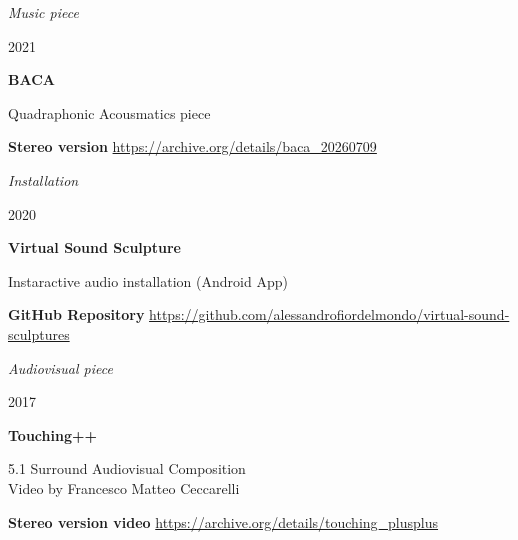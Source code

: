 \documentclass[7pt,a4paper]{article}
\begin{document}
\begin{mdframed}[
    backgroundcolor=white,
    linecolor=white,
    linewidth=0pt,
    innerleftmargin=6pt,
    innerrightmargin=6pt,
    innertopmargin=6pt,
    innerbottommargin=6pt,
    skipabove=0pt,
    skipbelow=0pt
]

\scriptsize \textit{Music piece}
\par \small 2021
\par \normalsize \textbf{BACA}
\par \small Quadraphonic Acousmatics piece


\par \scriptsize \textbf{Stereo version} \href{https://archive.org/details/baca\_20260709}{https://archive.org/details/baca\_20260709}


\vspace{0.5cm}
\end{mdframed}


\begin{mdframed}[
    backgroundcolor=entrygray,
    linecolor=entrygray,
    linewidth=0pt,
    innerleftmargin=6pt,
    innerrightmargin=6pt,
    innertopmargin=6pt,
    innerbottommargin=6pt,
    skipabove=0pt,
    skipbelow=0pt
]

\scriptsize \textit{Installation}
\par \small 2020
\par \normalsize \textbf{Virtual Sound Sculpture}
\par \small Instaractive audio installation (Android App)


\par \scriptsize \textbf{GitHub Repository} \href{https://github.com/alessandrofiordelmondo/virtual-sound-sculptures}{https://github.com/alessandrofiordelmondo/virtual-sound-sculptures}


\vspace{0.5cm}
\end{mdframed}


\begin{mdframed}[
    backgroundcolor=white,
    linecolor=white,
    linewidth=0pt,
    innerleftmargin=6pt,
    innerrightmargin=6pt,
    innertopmargin=6pt,
    innerbottommargin=6pt,
    skipabove=0pt,
    skipbelow=0pt
]

\scriptsize \textit{Audiovisual piece}
\par \small 2017
\par \normalsize \textbf{Touching++}
\par \small 5.1 Surround Audiovisual Composition\\Video by Francesco Matteo Ceccarelli


\par \scriptsize \textbf{Stereo version video} \href{https://archive.org/details/touching\_plusplus}{https://archive.org/details/touching\_plusplus}


\vspace{0.5cm}
\end{mdframed}
\end{document}
